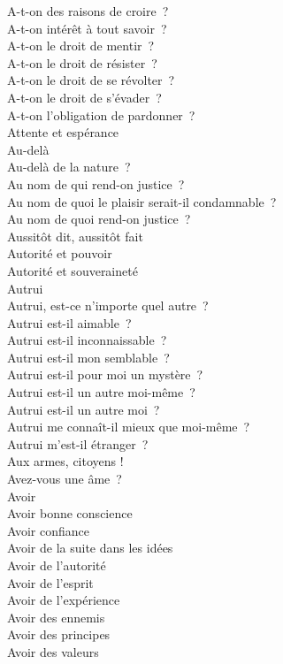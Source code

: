 \documentclass[a4paper,12pt]{article}
\begin{document}
A-t-on des raisons de croire ? \\
A-t-on intérêt à tout savoir ? \\
A-t-on le droit de mentir ? \\
A-t-on le droit de résister ? \\
A-t-on le droit de se révolter ? \\
A-t-on le droit de s'évader ? \\
A-t-on l'obligation de pardonner ? \\
Attente et espérance \\
Au-delà \\
Au-delà de la nature ? \\
Au nom de qui rend-on justice ? \\
Au nom de quoi le plaisir serait-il condamnable ? \\
Au nom de quoi rend-on justice ? \\
Aussitôt dit, aussitôt fait \\
Autorité et pouvoir \\
Autorité et souveraineté \\
Autrui \\
Autrui, est-ce n'importe quel autre ? \\
Autrui est-il aimable ? \\
Autrui est-il inconnaissable ? \\
Autrui est-il mon semblable ? \\
Autrui est-il pour moi un mystère ? \\
Autrui est-il un autre moi-même ? \\
Autrui est-il un autre moi ? \\
Autrui me connaît-il mieux que moi-même ? \\
Autrui m'est-il étranger ? \\
Aux armes, citoyens ! \\
Avez-vous une âme ? \\
Avoir \\
Avoir bonne conscience \\
Avoir confiance \\
Avoir de la suite dans les idées \\
Avoir de l'autorité \\
Avoir de l'esprit \\
Avoir de l'expérience \\
Avoir des ennemis \\
Avoir des principes \\
Avoir des valeurs \\
\end{document}
